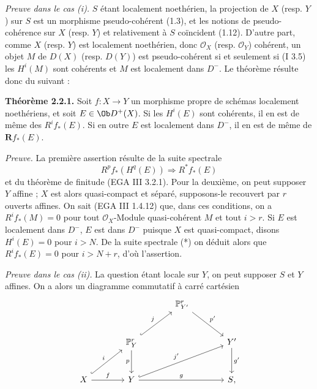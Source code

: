 \emph{Preuve dans le cas (i).} \(S\) étant localement noethérien, la projection de \(X\) (resp. \(Y\)) sur \(S\) est un morphisme pseudo-cohérent (1.3), et les notions de pseudo-cohérence sur \(X\) (resp. \(Y\)) et relativement à \(S\) coïncident (1.12). D'autre part, comme \(X\) (resp. \(Y\)) est localement noethérien, donc \(\mathcal O_X\) (resp. \(\mathcal O_Y\)) cohérent, un objet \(M\) de \(D(X)\) (resp. \(D(Y)\)) est pseudo-cohérent si et seulement si (I 3.5) les \(H^i(M)\) sont cohérents et \(M\) est localement dans \(D^{-}\). Le théorème résulte donc du suivant :

\textbf{Théorème 2.2.1.} Soit \(f:X\to Y\) un morphisme propre de schémas localement noethériens, et soit \(E\in\Ob D^+(X)\). Si les \(H^i(E)\) sont cohérents, il en est de même des \(R^if_*(E)\). Si en outre \(E\) est localement dans \(D^{-}\), il en est de même de \(\mathbf Rf_*(E)\).

\emph{Preuve.} La première assertion résulte de la suite spectrale
\begin{equation}\tag{$*$}
  R^pf_*(H^q(E)) \Longrightarrow R^*f_*(E)
\end{equation}
et du théorème de finitude (EGA III 3.2.1). Pour la deuxième, on peut supposer \(Y\) affine ; \(X\) est alors quasi-compact et séparé, supposons-le recouvert par \(r\) ouverts affines. On sait (EGA III 1.4.12) que, dans ces conditions, on a \(R^if_*(M)=0\) pour tout \(\mathcal O_X\)-Module quasi-cohérent \(M\) et tout \(i>r\). Si \(E\) est localement dans \(D^{-}\), \(E\) est dans \(D^{-}\) puisque \(X\) est quasi-compact, disons \(H^i(E)=0\) pour \(i>N\). De la suite spectrale (*) on déduit alors que \(R^if_*(E)=0\) pour \(i>N+r\), d'où l'assertion.

\emph{Preuve dans le cas (ii).} La question étant locale sur \(Y\), on peut supposer \(S\) et \(Y\) affines. On a alors un diagramme commutatif à carré cartésien
\[
\begin{tikzcd}[column sep=large,row sep=large]
& & \mathbb P^r_{Y'} \arrow[dr,"p'"] & \\
& \mathbb P^r_Y \arrow[ur,hook,"j"] \arrow[d,"p"'] & & Y' \arrow[d,"g'"]\\
X \arrow[ur,hook,"i"] \arrow[r,"f"] & Y \arrow[urr,hook,"j'"] \arrow[rr,"g"] & & S{,}
\end{tikzcd}
\]
